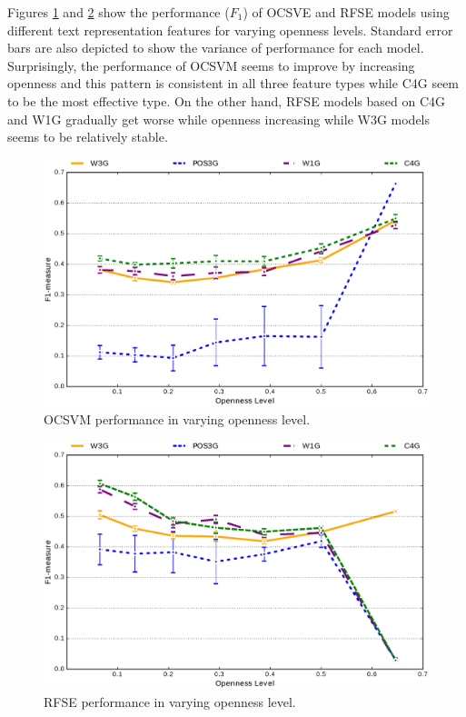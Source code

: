 Figures \ref{fig:OCSVME_openness_test} and \ref{fig:RFSE_openness_test} show the performance ($F_{1}$) of OCSVE and RFSE models using different text representation features for varying openness levels. Standard error bars are also depicted to show the variance of performance for each model. Surprisingly, the performance of OCSVM seems to improve by increasing openness and this pattern is consistent in all three feature types while C4G seem to be the most effective type. On the other hand, RFSE models based on C4G and W1G gradually get worse while openness increasing while W3G models seems to be relatively stable.

\begin{figure}[H]
\begin{center}
    \includegraphics[scale=0.38]{diagrams/OCSVME_openness_test_graph.eps}
	\caption{OCSVM performance in varying openness level.}
	\label{fig:OCSVME_openness_test}
\end{center}
\end{figure}

\begin{figure}[H]
\begin{center}
    \includegraphics[scale=0.38]{diagrams/RFSE_MIX_openness_test_graph.eps}
	\caption{RFSE performance in varying openness level.}
	\label{fig:RFSE_openness_test}
\end{center}
\end{figure}
%
%


